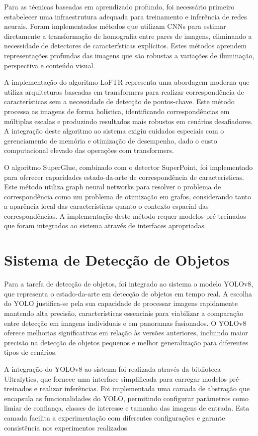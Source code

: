 Para as técnicas baseadas em aprendizado profundo, foi necessário primeiro estabelecer uma infraestrutura adequada para treinamento e inferência de redes neurais. Foram implementados métodos que utilizam CNNs para estimar diretamente a transformação de homografia entre pares de imagens, eliminando a necessidade de detectores de características explícitos. Estes métodos aprendem representações profundas das imagens que são robustas a variações de iluminação, perspectiva e conteúdo visual.

A implementação do algoritmo LoFTR representa uma abordagem moderna que utiliza arquiteturas baseadas em transformers para realizar correspondência de características sem a necessidade de detecção de pontos-chave. Este método processa as imagens de forma holística, identificando correspondências em múltiplas escalas e produzindo resultados mais robustos em cenários desafiadores. A integração deste algoritmo ao sistema exigiu cuidados especiais com o gerenciamento de memória e otimização de desempenho, dado o custo computacional elevado das operações com transformers.

O algoritmo SuperGlue, combinado com o detector SuperPoint, foi implementado para oferecer capacidades estado-da-arte de correspondência de características. Este método utiliza graph neural networks para resolver o problema de correspondência como um problema de otimização em grafos, considerando tanto a aparência local das características quanto o contexto espacial das correspondências. A implementação deste método requer modelos pré-treinados que foram integrados ao sistema através de interfaces apropriadas.

\section{Sistema de Detecção de Objetos}

Para a tarefa de detecção de objetos, foi integrado ao sistema o modelo YOLOv8, que representa o estado-da-arte em detecção de objetos em tempo real. A escolha do YOLO justifica-se pela sua capacidade de processar imagens rapidamente mantendo alta precisão, características essenciais para viabilizar a comparação entre detecção em imagens individuais e em panoramas fusionados. O YOLOv8 oferece melhorias significativas em relação às versões anteriores, incluindo maior precisão na detecção de objetos pequenos e melhor generalização para diferentes tipos de cenários.

A integração do YOLOv8 ao sistema foi realizada através da biblioteca Ultralytics, que fornece uma interface simplificada para carregar modelos pré-treinados e realizar inferências. Foi implementada uma camada de abstração que encapsula as funcionalidades do YOLO, permitindo configurar parâmetros como limiar de confiança, classes de interesse e tamanho das imagens de entrada. Esta camada facilita a experimentação com diferentes configurações e garante consistência nos experimentos realizados.

